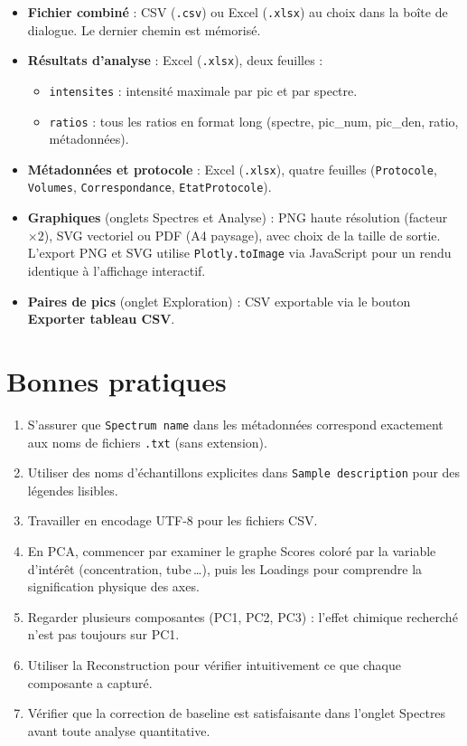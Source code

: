 \documentclass[12pt, a4paper]{article}
\begin{document}
\begin{itemize}
  \item \textbf{Fichier combiné} : CSV (\texttt{.csv}) ou Excel
        (\texttt{.xlsx}) au choix dans la boîte de dialogue. Le dernier
        chemin est mémorisé.
  \item \textbf{Résultats d'analyse} : Excel (\texttt{.xlsx}), deux feuilles :
    \begin{itemize}
      \item \texttt{intensites} : intensité maximale par pic et par spectre.
      \item \texttt{ratios} : tous les ratios en format long
            (spectre, pic\_num, pic\_den, ratio, métadonnées).
    \end{itemize}
  \item \textbf{Métadonnées et protocole} : Excel (\texttt{.xlsx}),
        quatre feuilles (\texttt{Protocole}, \texttt{Volumes},
        \texttt{Correspondance}, \texttt{EtatProtocole}).
  \item \textbf{Graphiques} (onglets Spectres et Analyse) : PNG haute
        résolution (facteur $\times 2$), SVG vectoriel ou PDF (A4 paysage),
        avec choix de la taille de sortie. L'export PNG et SVG utilise
        \texttt{Plotly.toImage} via JavaScript pour un rendu identique à
        l'affichage interactif.
  \item \textbf{Paires de pics} (onglet Exploration) : CSV exportable via
        le bouton \textbf{Exporter tableau CSV}.
\end{itemize}

\section{Bonnes pratiques}

\begin{enumerate}
  \item S'assurer que \texttt{Spectrum name} dans les métadonnées correspond
        exactement aux noms de fichiers \texttt{.txt} (sans extension).
  \item Utiliser des noms d'échantillons explicites dans \texttt{Sample
        description} pour des légendes lisibles.
  \item Travailler en encodage UTF-8 pour les fichiers CSV.
  \item En PCA, commencer par examiner le graphe Scores coloré par la variable
        d'intérêt (concentration, tube\,\ldots), puis les Loadings pour
        comprendre la signification physique des axes.
  \item Regarder plusieurs composantes (PC1, PC2, PC3) : l'effet chimique
        recherché n'est pas toujours sur PC1.
  \item Utiliser la Reconstruction pour vérifier intuitivement ce que chaque
        composante a capturé.
  \item Vérifier que la correction de baseline est satisfaisante dans
        l'onglet Spectres avant toute analyse quantitative.
\end{enumerate}
\end{document}

